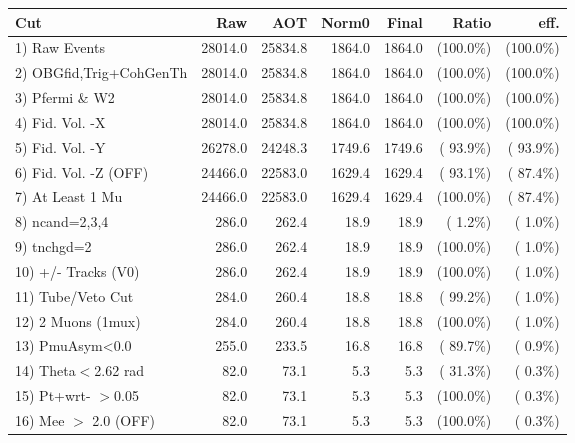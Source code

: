  \begin{table}[h!]\centering
 \begin{tabular}{||l||r|r|r|r|r|r||}
 \hline
 \hline
 Cut & Raw & AOT & Norm0 & Final & Ratio & eff.       \\
 \hline
  1) Raw Events           &      28014.0 &      25834.8 &       1864.0 &       1864.0 & (100.0\%) & (100.0\%) \\
  2) OBGfid,Trig+CohGenTh &      28014.0 &      25834.8 &       1864.0 &       1864.0 & (100.0\%) & (100.0\%) \\
  3) Pfermi \& W2         &      28014.0 &      25834.8 &       1864.0 &       1864.0 & (100.0\%) & (100.0\%) \\
  4) Fid. Vol. -X         &      28014.0 &      25834.8 &       1864.0 &       1864.0 & (100.0\%) & (100.0\%) \\
  5) Fid. Vol. -Y         &      26278.0 &      24248.3 &       1749.6 &       1749.6 & ( 93.9\%) & ( 93.9\%) \\
  6) Fid. Vol. -Z (OFF)   &      24466.0 &      22583.0 &       1629.4 &       1629.4 & ( 93.1\%) & ( 87.4\%) \\
  7) At Least 1 Mu        &      24466.0 &      22583.0 &       1629.4 &       1629.4 & (100.0\%) & ( 87.4\%) \\
  8) ncand=2,3,4          &        286.0 &        262.4 &         18.9 &         18.9 & (  1.2\%) & (  1.0\%) \\
  9) tnchgd=2             &        286.0 &        262.4 &         18.9 &         18.9 & (100.0\%) & (  1.0\%) \\
 10) +/- Tracks (V0)      &        286.0 &        262.4 &         18.9 &         18.9 & (100.0\%) & (  1.0\%) \\
 11) Tube/Veto Cut        &        284.0 &        260.4 &         18.8 &         18.8 & ( 99.2\%) & (  1.0\%) \\
 12) 2 Muons (1mux)       &        284.0 &        260.4 &         18.8 &         18.8 & (100.0\%) & (  1.0\%) \\
 13) PmuAsym<0.0          &        255.0 &        233.5 &         16.8 &         16.8 & ( 89.7\%) & (  0.9\%) \\
 14) Theta$<$2.62 rad     &         82.0 &         73.1 &          5.3 &          5.3 & ( 31.3\%) & (  0.3\%) \\
 15) Pt+wrt- $>$0.05      &         82.0 &         73.1 &          5.3 &          5.3 & (100.0\%) & (  0.3\%) \\
 16) Mee $>$ 2.0  (OFF)   &         82.0 &         73.1 &          5.3 &          5.3 & (100.0\%) & (  0.3\%) \\

\end{tabular}
\end{table}
